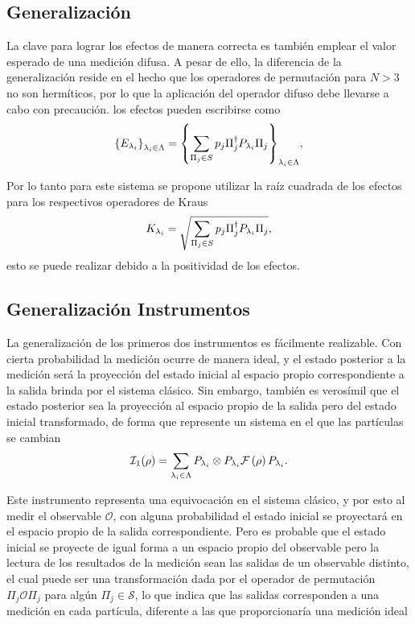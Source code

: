 \documentclass[12pt,letterpaper]{book}\raggedbottom{}
\begin{document}
\subsection{Generalización}
La clave para lograr los efectos de manera correcta es también emplear el valor
esperado de una medición difusa. A pesar de ello, la diferencia de la
generalización reside en el hecho que los operadores de permutación para $N>3$
no son hermíticos, por lo que la aplicación del operador difuso debe llevarse a
cabo con precaución.
los efectos pueden escribirse como
\begin{equation*}
    {\{E_{\lambda_i}\}}_{\lambda_i \in \Lambda}={\left\{\sum_{\Pi_j \in S} p_j \Pi_{j}^{\dagger}P_{\lambda_i}\Pi_{j}\right\}}_{\lambda_i \in \Lambda},
\end{equation*}  

Por lo tanto para este sistema se propone utilizar
la raíz cuadrada de los efectos para los respectivos operadores de Kraus 
\begin{equation}
   K_{\lambda_i}=\sqrt{\sum_{\Pi_j \in S} p_j \Pi_{j}^{\dagger}P_{\lambda_i} \Pi_{j}},
\end{equation} 
esto se puede realizar debido a la positividad de los efectos.

\subsection{Generalización Instrumentos}
La generalización de los primeros dos instrumentos es fácilmente realizable.
Con cierta probabilidad la medición ocurre de manera ideal, y
el estado posterior a la medición será la proyección del estado inicial al
espacio propio correspondiente a la salida brinda por el sistema clásico. Sin
embargo, también es verosímil que el estado posterior sea la proyección al
espacio propio de la salida pero del estado inicial transformado, de forma que
represente un sistema en el que las partículas se cambian
\begin{equation*}
    \mathcal{I}_1(\rho)=\sum_{\lambda_i \in \Lambda }P_{\lambda_i}\otimes P_{\lambda_i}\mathcal{F}\left(\rho\right)P_{\lambda_i}.
\end{equation*} 


Este instrumento representa una equivocación en el sistema clásico,
y por esto al medir el observable $\mathcal{O}$, con alguna probabilidad el
estado inicial se proyectará en el espacio propio de la salida correspondiente.
Pero es probable que el estado inicial se proyecte de igual forma a un espacio
propio del observable pero la lectura de los resultados de la medición sean las
salidas de un observable distinto, el cual puede ser una transformación dada
por el operador de permutación $\Pi_j\mathcal{O}\Pi_j$ para algún $\Pi_j\in
\mathcal{S}$, lo que indica que las salidas corresponden a una medición en cada
partícula, diferente a las que proporcionaría una medición ideal
\end{document}

